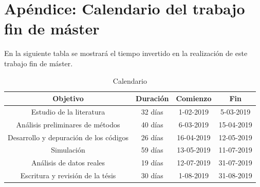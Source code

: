 \documentclass[12pt]{report} %
\theoremstyle{definition}
\begin{document}
\newpage



\chapter{Apéndice: Calendario del trabajo fin de máster}
En la siguiente tabla se mostrará el tiempo invertido en la realización de este trabajo fin de máster.

\begin{table}[H]
	\centering
	\caption{Calendario}
	\begin{tabular}{|c|c|c|c|}
		\hline
Objetivo                               & Duración & Comienzo   & Fin        \\ \hline
Estudio de la literatura               & 32 días  & 1-02-2019  & 5-03-2019 \\ \hline
Análisis preliminares de métodos       & 40 días  & 6-03-2019  & 15-04-2019 \\ \hline
Desarrollo y depuración de los códigos & 26 días  & 16-04-2019 & 12-05-2019 \\ \hline
Simulación                             & 59 días  & 13-05-2019 & 11-07-2019  \\ \hline
Análisis de datos reales               & 19 días  & 12-07-2019 & 31-07-2019 \\ \hline
Escritura y revisión de la tésis       & 30 días  & 1-08-2019  & 31-08-2019 \\ \hline
	\end{tabular}
\end{table}
\end{document}
